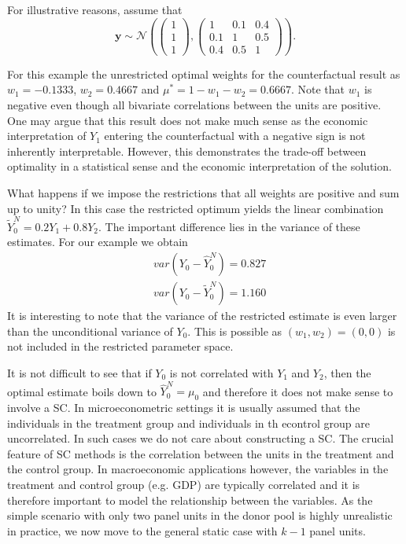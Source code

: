 For illustrative reasons, assume that 
\[
\boldsymbol{y} \sim \mathcal{N}\left( 
\begin{pmatrix} 1\\ 1\\ 1 \end{pmatrix}, 
\begin{pmatrix} 1 &0.1 &0.4\\0.1 &1 &0.5\\0.4 &0.5 &1 \end{pmatrix}\right). 
\] 

For this example the unrestricted optimal weights for the counterfactual result as $w_1 = -0.1333$, $w_2 = 0.4667$ and $\mu^* = 1- w_1 - w_2 = 0.6667$. Note that $w_1$ is negative even though all bivariate correlations between the units are positive. One may argue that this result does not make much sense as the economic interpretation of $Y_1$ entering the counterfactual with a negative sign is not inherently interpretable. However, this demonstrates the trade-off between optimality in a statistical sense and the economic interpretation of the solution.  

What happens if we impose the restrictions that all weights are positive and sum up to unity? In this case the restricted optimum yields the linear combination $\widetilde{Y}^{N}_{0} = 0.2 Y_1 + 0.8 Y_2$. The important difference lies in the variance of these estimates. For our example we obtain
\begin{equation*}
	\begin{split}
		& var(Y_0 - \widehat{Y}^{N}_{0}) = 0.827 \\
		& var(Y_0 - \widetilde{Y}^{N}_{0}) = 1.160		
	\end{split}
\end{equation*}
It is interesting to note that the variance of the restricted estimate is even larger than the unconditional variance of $Y_0$. This is possible as $(w_1, w_2) = (0,0)$ is not included in the restricted parameter space. 

It is not difficult to see that if $Y_0$ is not correlated with $Y_1$ and $Y_2$, then the optimal estimate boils down to $\widehat{Y}^{N}_{0} = \mu_0$ and therefore it does not make sense to involve a \ac{SC}. In microeconometric settings it is usually assumed that the individuals in the treatment group and individuals in th econtrol group are uncorrelated. In such cases we do not care about constructing a \ac{SC}. The crucial feature of \ac{SC} methods is the correlation between the units in the treatment and the control group. In macroeconomic applications however, the variables in the treatment and control group (e.g. \ac{GDP}) are typically correlated and it is therefore important to model the relationship between the variables. As the simple scenario with only two panel units in the donor pool is highly unrealistic in practice, we now move to the general static case with $k-1$ panel units.
